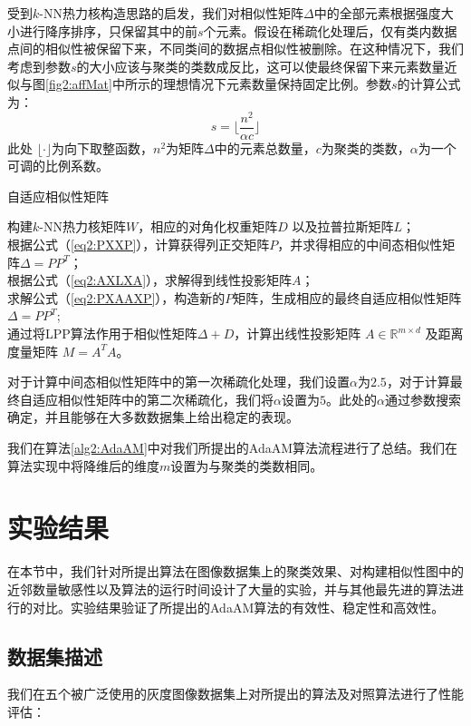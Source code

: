 受到$k$-NN热力核构造思路的启发，我们对相似性矩阵$\Delta$中的全部元素根据强度大小进行降序排序，只保留其中的前$s$个元素。假设在稀疏化处理后，仅有类内数据点间的相似性被保留下来，不同类间的数据点相似性被删除。在这种情况下，我们考虑到参数$s$的大小应该与聚类的类数成反比，这可以使最终保留下来元素数量近似与图\ref{fig2:affMat}中所示的理想情况下元素数量保持固定比例。参数$s$的计算公式为：
\begin{equation}
	s = \lfloor \frac{n^2}{\alpha c}\rfloor
\end{equation}
此处 $\lfloor \cdot\rfloor$为向下取整函数，$n^2$为矩阵$\Delta$中的元素总数量，$c$为聚类的类数，$\alpha$为一个可调的比例系数。

\begin{algorithm}[t]
	\caption{自适应相似性矩阵}
	\label{alg2:AdaAM}
	构建$k$-NN热力核矩阵$W$，相应的对角化权重矩阵$D$ 以及拉普拉斯矩阵$L$；\\
	根据公式（\ref{eq2:PXXP}），计算获得列正交矩阵$P$，并求得相应的中间态相似性矩阵$\Delta = PP^T$；\\
	根据公式（\ref{eq2:AXLXA}），求解得到线性投影矩阵$A$；\\
	求解公式（\ref{eq2:PXAAXP}），构造新的$P$矩阵，生成相应的最终自适应相似性矩阵$\Delta = PP^T$;\\
	通过将LPP算法作用于相似性矩阵$\Delta + D$，计算出线性投影矩阵 $A\in\mathbb{R}^{m\times d}$ 及距离度量矩阵 $M=A^TA$。
\end{algorithm}

对于计算中间态相似性矩阵中的第一次稀疏化处理，我们设置$\alpha$为$2.5$，对于计算最终自适应相似性矩阵中的第二次稀疏化，我们将$\alpha$设置为$5$。此处的$\alpha$通过参数搜索确定，并且能够在大多数数据集上给出稳定的表现。

我们在算法\ref{alg2:AdaAM}中对我们所提出的AdaAM算法流程进行了总结。我们在算法实现中将降维后的维度$m$设置为与聚类的类数相同。


\section{实验结果}
\label{sec2:Exp}
在本节中，我们针对所提出算法在图像数据集上的聚类效果、对构建相似性图中的近邻数量敏感性以及算法的运行时间设计了大量的实验，并与其他最先进的算法进行的对比。实验结果验证了所提出的AdaAM算法的有效性、稳定性和高效性。
\subsection{数据集描述}
我们在五个被广泛使用的灰度图像数据集上对所提出的算法及对照算法进行了性能评估：

